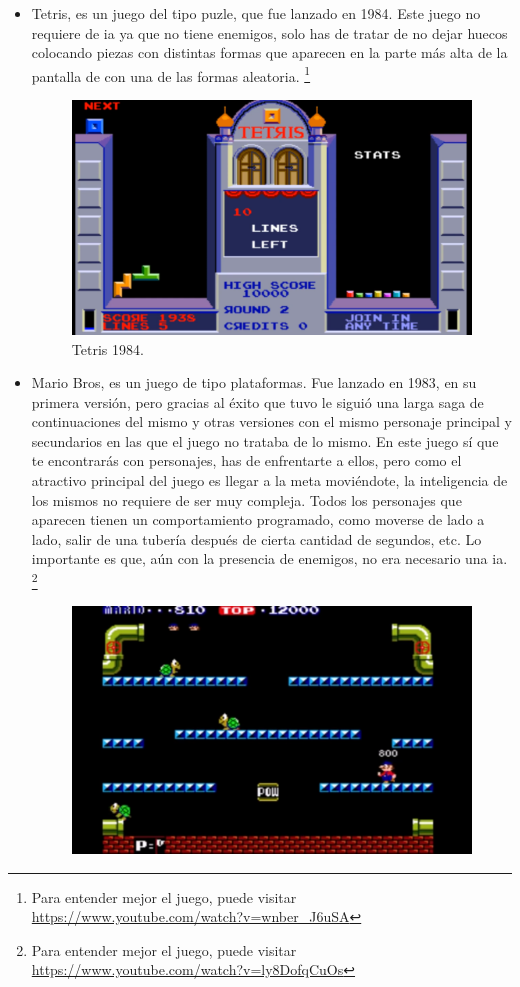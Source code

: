 \begin{itemize}
	\item Tetris, es un juego del tipo puzle, que fue lanzado en 1984. Este juego no requiere de \gls{ia} ya que no tiene enemigos, solo has de tratar de no dejar huecos colocando piezas con distintas formas que aparecen en la parte más alta de la pantalla de con una de las formas aleatoria. \footnote{Para entender mejor el juego, puede visitar \url{https://www.youtube.com/watch?v=wnber_J6uSA}}
	\begin{figure}[h]
		\centering
		\includegraphics[width=15cm]{archivos/imagenes/tetris-1984.png}
		\caption{Tetris 1984.}
	\end{figure}
	\item Mario Bros, es un juego de tipo plataformas. Fue lanzado en 1983, en su primera versión, pero gracias al éxito que tuvo le siguió una larga saga de continuaciones del mismo y otras versiones con el mismo personaje principal y secundarios en las que el juego no trataba de lo mismo. En este juego sí que te encontrarás con personajes, has de enfrentarte a ellos, pero como el atractivo principal del juego es llegar a la meta moviéndote, la inteligencia de los mismos no requiere de ser muy compleja. Todos los personajes que aparecen tienen un comportamiento programado, como moverse de lado a lado, salir de una tubería después de cierta cantidad de segundos, etc. Lo importante es que, aún con la presencia de enemigos, no era necesario una \gls{ia}. \footnote{Para entender mejor el juego, puede visitar \url{https://www.youtube.com/watch?v=ly8DofqCuOs}}
	\begin{figure}[h]
		\centering
		\includegraphics[width=15cm]{archivos/imagenes/mario-bros-1983.png}

\end{figure}
\end{itemize}
